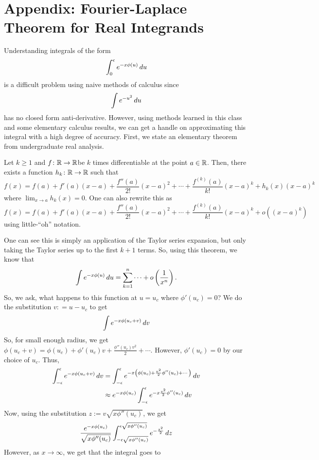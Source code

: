 \documentclass[11pt,leqno,oneside]{amsbook}
\numberwithin{thm}{section}
\begin{document}
\section{Appendix: Fourier-Laplace Theorem for Real Integrands}
Understanding integrals of the form \[
  \int_0^\epsilon e^{-x\phi(u)} \, d u
\]
is a difficult problem using naive methods of calculus since \[
  \int e^{-u^2} \, d u
\]
has no closed form anti-derivative. However, using methods learned in this
class and some elementary calculus results, we can get a handle on
approximating this integral with a high degree of accuracy. First, we
state an elementary theorem from undergraduate real analysis.
\begin{thm}
  Let \(k \geq 1\) and \(f \colon {\mathbb R} \to {\mathbb R}\)be \(k\) times
  differentiable at the point \(a \in {\mathbb R}\). Then, there exists a
  function \(h_k \colon {\mathbb R} \to {\mathbb R}\) such that \[
    f(x) = f(a) + f'(a)(x-a) + \frac{f''(a)}{2!}(x-a)^2 + \cdots +
    \frac{f^{(k)}(a)}{k!}(x-a)^k + h_k(x)(x-a)^k
  \]
  where \(\lim_{x \to a} h_k(x) = 0\). One can also rewrite this as \[
    f(x) = f(a) + f'(a)(x-a) + \frac{f''(a)}{2!}(x-a)^2 + \cdots +
    \frac{f^{(k)}(a)}{k!}(x-a)^k + o((x-a)^k)
  \]
  using little-``oh'' notation.
\end{thm}
One can see this is simply an application of the Taylor series
expansion, but only taking the Taylor series up to the first \(k+1\)
terms. So, using this theorem, we know that \[
  \int e^{-x \phi(u)} \, d u = \sum_{k=1}^n \cdots + o\left( \frac{1}{x^n} \right).
\]
So, we ask, what happens to this function at \(u = u_c\) where
\(\phi'(u_c)=0\)? We do the substitution \(v : = u - u_c\) to get \[
  \int e^{-x \phi(u_c+v)} \, d v
\]
So, for small enough radius, we get \(\phi(u_c + v) = \phi(u_c) +
\phi'(u_c)v + \frac{\phi''(u_c)v^2}{2} + \cdots\). However,
\(\phi'(u_c) = 0\) by our choice of \(u_c\). Thus,
\begin{align*}
  \int_{-\epsilon}^\epsilon e^{-x \phi(u_c+v)} \, d v
  & = \int_{-\epsilon}^\epsilon e^{-x \left( \phi(u_c) + \frac{v^2}{2}
    \phi''(u_c) + \cdots\right)} \, d v \\
  & \approx e^{-x\phi(u_c)} \int_{-\epsilon}^\epsilon e^{-x \frac{v^2}{2}
    \phi''(u_c)} \, d v
\end{align*}
Now, using the substitution \(z := v \sqrt{x \phi''(u_c)}\), we get \[
  \frac{e^{-x \phi(u_c)}}{\sqrt{x \phi''(u_c)}} \int_{- \epsilon
    \sqrt{x \phi''(u_c)}}^{\epsilon \sqrt{x \phi''(u_c)}}
  e^{-\frac{z^2}{2}} \, d z
\]
However, as \(x \to \infty\), we get that the integral goes to
\end{document}
